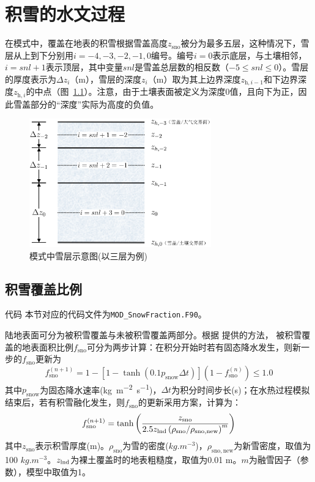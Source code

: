 \chapter{积雪的水文过程}
在模式中，覆盖在地表的积雪根据雪盖高度$z_{\mathrm{sno}}$被分为最多五层，这种情况下，雪层从上到下分别用$i = −4, −3, −2, −1, 0$编号。编号$i = 0$表示底层，与土壤相邻，$i = snl + 1$表示顶层，其中变量$snl$是雪盖总层数的相反数（$-5\leqslant snl\leqslant 0$）。雪层的厚度表示为$\Delta z_i$（m），雪层的深度$z_i$（m）取为其上边界深度$z_{\mathrm{h},i-1}$和下边界深度$z_{\mathrm{h},i}$的中点（图~\ref{fig:模式中积雪雪层示意图}）。注意，由于土壤表面被定义为深度0值，且向下为正，因此雪盖部分的“深度”实际为高度的负值。
{
  \begin{figure}[htbp]
    \centering
    \includegraphics[width=0.7\textwidth]{Figures/雪盖土壤热力过程/模式中积雪雪层示意图.png}
    \caption{模式中雪层示意图(以三层为例)}
    \label{fig:模式中积雪雪层示意图}
  \end{figure}
}
\section{积雪覆盖比例}\label{积雪覆盖比例}
\begin{mymdframed}{代码}
  本节对应的代码文件为\texttt{MOD\_SnowFraction.F90}。
\end{mymdframed}

陆地表面可分为被积雪覆盖与未被积雪覆盖两部分。根据 \citet{swenson2012new}提供的方法，
被积雪覆盖的地表面积比例$f_{\mathrm{sno}}$可分为两步计算：在积分开始时若有固态降水发生，则新一步的$f_{\mathrm{sno}}$更新为
\begin{equation}
  f_{\mathrm{{sno }}}^{(n+1)}=1-\left[1-\tanh\left(0.1 p_{\mathrm{snow}} \Delta t\right)\right]\left(1-f_{\mathrm{{sno }}}^{(n)}\right) \leqslant 1.0
\end{equation}
其中$p_{\mathrm {snow}} $为固态降水速率(\unit{kg.m^{-2}.s^{-1}})，$\Delta t$为积分时间步长(s)；在水热过程模拟结束后，若有积雪融化发生，则$f_{\mathrm{sno}}$的更新采用\citet{niu2007ObservationbasedFormulationSnow}方案，计算为：
\begin{equation}
  f_{\mathrm{sno}}^{(n+1)}=\tanh{\left(\frac{z_{\mathrm{sno}}}{2.5 z_{\rm lnd} \left ( \rho_{\mathrm{sno}}/\rho_{\mathrm {sno,new}} \right )^m}\right)}
\end{equation}
其中$z_{\mathrm{sno}}$表示积雪厚度(m)。$\rho_{\mathrm{sno}}$为雪的密度($\unit{kg.m^{-3}}$)，$\rho_{\mathrm {sno,new}}$为新雪密度，取值为100 $\unit{kg.m^{-3}}$。$z_{\rm lnd}$为裸土覆盖时的地表粗糙度，取值为0.01 m。$m$为融雪因子（参数），模型中取值为1。

